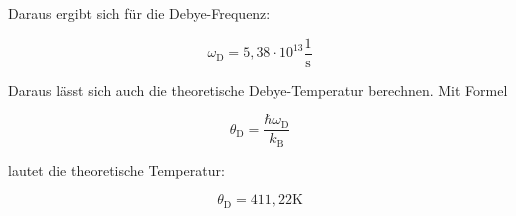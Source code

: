 \noindent Daraus ergibt sich für die Debye-Frequenz:

\begin{equation*}
\omega_\text{D}=5,38\cdot10^{13}\frac{1}{\text{s}}
\end{equation*}

\noindent Daraus lässt sich auch die theoretische Debye-Temperatur berechnen. Mit Formel

\begin{equation}
\theta_\text{D}=\frac{\hbar\omega_\text{D}}{k_\text{B}}
\end{equation}

lautet die theoretische Temperatur:

\begin{equation*}
\theta_\text{D}=411,22\text{K}
\end{equation*}